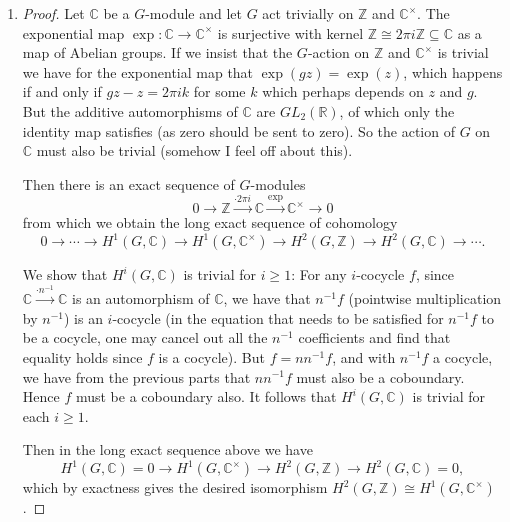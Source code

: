 \documentclass[11pt]{article}
\begin{document}
\begin{enumerate}[label=(\alph*)]
\begin{proof}
        The induction step is similar. For $n\geq 1$ if $B$ is a cohomologically trivial module containing $A$ then again we have $H^n(G,B/A)\cong H^{n+1}(G,A)$. If we assume that $nH^i(G,S) = 0$ for any $G$-module $S$ then $nH^i(G,B/A) \cong nH^{i+1}(G,A) = 0$. As $A$ was arbitrary, the prior statement is true for any $G$-module $A$. By induction it follows that $nH^i(G,A) = 0$ for $n\geq 1$ and any $G$-module $A$.
    \end{proof}
    \item \begin{proof}
        Let $\mathbb{C}$ be a $G$-module and let $G$ act trivially on $\mathbb{Z}$ and $\mathbb{C}^\times$. The exponential map $\exp\colon \mathbb{C}\to \mathbb{C}^\times$ is surjective with kernel $\mathbb{Z}\cong 2\pi i \mathbb{Z}\subseteq \mathbb{C}$ as a map of Abelian groups. If we insist that the $G$-action on $\mathbb{Z}$ and $\mathbb{C}^\times$ is trivial we have for the exponential map that $\exp(gz) = \exp(z)$, which happens if and only if $gz-z = 2\pi i k$ for some $k$ which perhaps depends on $z$ and $g$. But the additive automorphisms of $\mathbb{C}$ are $GL_2(\mathbb{R})$, of which only the identity map satisfies (as zero should be sent to zero). So the action of $G$ on $\mathbb{C}$ must also be trivial (somehow I feel off about this).
        
        Then there is an exact sequence of $G$-modules \[0\to \mathbb{Z}\xrightarrow{\cdot 2\pi i}\mathbb{C}\xrightarrow{\exp}\mathbb{C}^\times\to 0\] from which we obtain the long exact sequence of cohomology \[0\to \cdots\to H^1(G,\mathbb{C}) \to H^1(G,\mathbb{C}^\times)\to H^2(G,\mathbb{Z})\to H^2(G,\mathbb{C})\to\cdots.\] 

        We show that $H^i(G,\mathbb{C})$ is trivial for $i\geq 1$: For any $i$-cocycle $f$, since $\mathbb{C}\xrightarrow{\cdot n^{-1}}\mathbb{C}$ is an automorphism of $\mathbb{C}$, we have that $n^{-1}f$ (pointwise multiplication by $n^{-1}$) is an $i$-cocycle (in the equation that needs to be satisfied for $n^{-1}f$ to be a cocycle, one may cancel out all the $n^{-1}$ coefficients and find that equality holds since $f$ is a cocycle). But $f = nn^{-1}f$, and with $n^{-1}f$ a cocycle, we have from the previous parts that $nn^{-1}f$ must also be a coboundary. Hence $f$ must be a coboundary also. It follows that $H^i(G,\mathbb{C})$ is trivial for each $i\geq 1$.

        Then in the long exact sequence above we have \[H^1(G,\mathbb{C}) = 0 \to H^1(G,\mathbb{C}^\times)\to H^2(G,\mathbb{Z})\to H^2(G,\mathbb{C}) = 0,\] which by exactness gives the desired isomorphism $H^2(G,\mathbb{Z})\cong H^1(G,\mathbb{C}^\times)$.
    \end{proof}
\end{enumerate}
\end{document}
